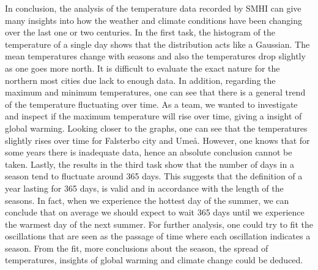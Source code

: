 In conclusion, the analysis of the temperature data recorded by SMHI can give many insights into how the weather and climate conditions have been changing over the last one or two centuries.
\newline
In the first task, the histogram of the temperature of a single day shows that the distribution acts like a Gaussian. The mean  temperatures change with seasons and also the temperatures drop slightly as one goes more north. It is difficult to evaluate the exact nature for the northern most cities due lack to enough data.
\newline
In addition, regarding the maximum and minimum temperatures, one can see that there is a general trend of the temperature fluctuating over time. As a team, we wanted to investigate and inspect if the maximum temperature will rise over time, giving a insight of global warming. Looking closer to the graphs, one can see that the temperatures slightly rises over time for Falsterbo city and Umeå. However, one knows that for some years there is inadequate data, hence an absolute conclusion cannot be taken.
\newline
Lastly, the results in the third task show that the number of days in a season tend to fluctuate around 365 days. This suggests that the definition of a year lasting for 365 days, is valid and in accordance with the length of the seasons. In fact, when we experience the hottest day of the summer, we can conclude that on average we should expect to wait 365 days until we experience the warmest day of the next summer.
\newline
For further analysis, one could try to fit the oscillations that are seen as the passage of time where each oscillation indicates a season. From the fit, more conclusions about the season, the spread of temperatures, insights of global warming and climate change could be deduced. 

